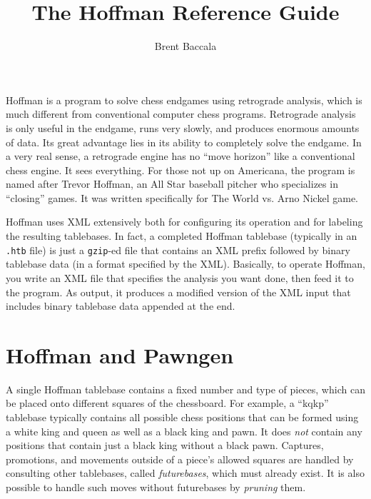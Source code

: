 \documentclass[11pt]{article}
\title{The Hoffman Reference Guide}
\author{Brent Baccala}
\begin{document}
\maketitle

\parindent 0pt
\parskip 12pt

Hoffman is a program to solve chess endgames using retrograde
analysis, which is much different from conventional computer chess
programs.  Retrograde analysis is only useful in the endgame, runs
very slowly, and produces enormous amounts of data.  Its great
advantage lies in its ability to completely solve the endgame.  In a
very real sense, a retrograde engine has no ``move horizon'' like a
conventional chess engine.  It sees everything.  For those not up on
Americana, the program is named after Trevor Hoffman, an All Star
baseball pitcher who specializes in ``closing'' games.  It was written
specifically for The World vs. Arno Nickel game.

Hoffman uses XML extensively both for configuring its operation and
for labeling the resulting tablebases.  In fact, a completed Hoffman
tablebase (typically in an {\tt .htb} file) is just a {\tt gzip}-ed
file that contains an XML prefix followed by binary tablebase data (in
a format specified by the XML).  Basically, to operate Hoffman, you
write an XML file that specifies the analysis you want done, then feed
it to the program.  As output, it produces a modified version of the
XML input that includes binary tablebase data appended at the end.

\section{Hoffman and Pawngen}

A single Hoffman tablebase contains a fixed number and type of pieces,
which can be placed onto different squares of the chessboard.  For
example, a ``kqkp'' tablebase typically contains all possible chess
positions that can be formed using a white king and queen as well as a
black king and pawn.  It does {\it not} contain any positions that
contain just a black king without a black pawn.  Captures, promotions,
and movements outside of a piece's allowed squares are handled by
consulting other tablebases, called {\it futurebases}, which must
already exist.  It is also possible to handle such moves without
futurebases by {\it pruning} them.
\end{document}
